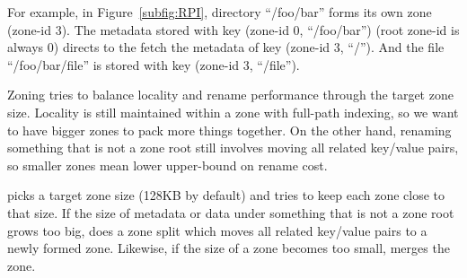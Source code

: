 For example, in Figure~\ref{subfig:RPI}, directory ``/foo/bar'' forms
its own zone (zone-id 3).
The metadata stored with key (zone-id 0, ``/foo/bar'') (root zone-id is always
0) directs \betrfs to the fetch the metadata of key (zone-id 3, ``/'').
And the file ``/foo/bar/file'' is stored with key (zone-id 3, ``/file'').

Zoning tries to balance locality and rename performance through the target zone
size.
Locality is still maintained within a zone with full-path indexing, so we
want to have bigger zones to pack more things together.
On the other hand, renaming something that is not a zone root still involves
moving all related key/value pairs, so smaller zones mean lower upper-bound
on rename cost.

\betrfsTwo picks a target zone size (128KB by default) and tries to keep each
zone close to that size.
If the size of metadata or data under something that is not a zone root
grows too big, \betrfsTwo does a zone split which moves all related key/value
pairs to a newly formed zone.
Likewise, if the size of a zone becomes too small, \betrfsTwo merges the zone.
